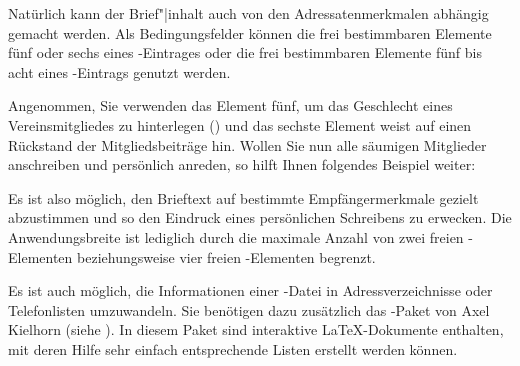 Natürlich kann der Brief"|inhalt auch von den Adressatenmerkmalen
abhängig gemacht werden. Als Bedingungsfelder können die frei
bestimmbaren Elemente fünf oder sechs eines
-Eintrages oder die frei bestimmbaren
Elemente fünf bis acht eines -Eintrags
genutzt werden.
\begin{Example}
  Angenommen, Sie verwenden das Element fünf, um das Geschlecht eines
  Vereinsmitgliedes zu hinterlegen () und das sechste
  Element weist auf einen Rückstand der Mitgliedsbeiträge hin. Wollen
  Sie nun alle säumigen Mitglieder anschreiben und persönlich anreden,
  so hilft Ihnen folgendes Beispiel weiter:
\begin{lstcode}
  \renewcommand*{\adrentry}[8]{
    \ifdim #6pt>0pt\relax
      \begin{letter}{#2 #1\\#3}
        \if #5m \opening{Lieber #2,} \fi
        \if #5w \opening{Liebe #2,} \fi

        Leider mussten wir feststellen, dass du mit
        der Zahlung deiner Mitgliedsbeiträge im
        Rückstand bist.

        Wir möchten Dich bitten, den offenen Betrag
        von #6~EUR auf das Vereinskonto einzuzahlen.
        \closing{Petri Heil,}
      \end{letter}
    \fi
  }
\end{lstcode}
\end{Example}
Es ist also möglich, den Brieftext auf bestimmte Empfängermerkmale
gezielt abzustimmen und so den Eindruck eines persönlichen
Schreibens zu erwecken. Die Anwendungsbreite ist lediglich durch
die maximale Anzahl von zwei freien -Elementen
beziehungsweise vier freien -Elementen
begrenzt.


\begin{Declaration}
\end{Declaration}
%
Es ist auch möglich, die Informationen einer -Datei in
Adressverzeichnisse oder Telefonlisten umzuwandeln. Sie benötigen dazu
zusätzlich das -Paket von Axel Kielhorn
(siehe \cite{package:adrconv}). In diesem Paket sind interaktive
\LaTeX-Dokumente enthalten, mit deren Hilfe sehr einfach entsprechende Listen
erstellt werden können.


